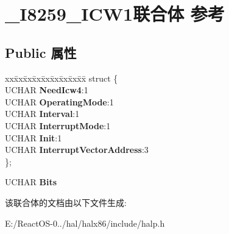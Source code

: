 \hypertarget{union___i8259___i_c_w1}{}\section{\+\_\+\+I8259\+\_\+\+I\+C\+W1联合体 参考}
\label{union___i8259___i_c_w1}
\subsection*{Public 属性}
\begin{DoxyCompactItemize}
\item 
\mbox{\label{union___i8259___i_c_w1_a68462cb8de3e9edf3ab373dfe2a562ee}} 
\begin{tabbing}
xx\=xx\=xx\=xx\=xx\=xx\=xx\=xx\=xx\=\kill
struct \{\\
\>UCHAR {\bfseries NeedIcw4}:1\\
\>UCHAR {\bfseries OperatingMode}:1\\
\>UCHAR {\bfseries Interval}:1\\
\>UCHAR {\bfseries InterruptMode}:1\\
\>UCHAR {\bfseries Init}:1\\
\>UCHAR {\bfseries InterruptVectorAddress}:3\\
\}; \\

\end{tabbing}\item 
\mbox{\label{union___i8259___i_c_w1_a132a6eb21eec70ee45e5d22501cb0fcd}} 
U\+C\+H\+AR {\bfseries Bits}
\end{DoxyCompactItemize}


该联合体的文档由以下文件生成\+:\begin{DoxyCompactItemize}
\item 
E\+:/\+React\+O\+S-\/0../hal/halx86/include/halp.\+h\end{DoxyCompactItemize}

